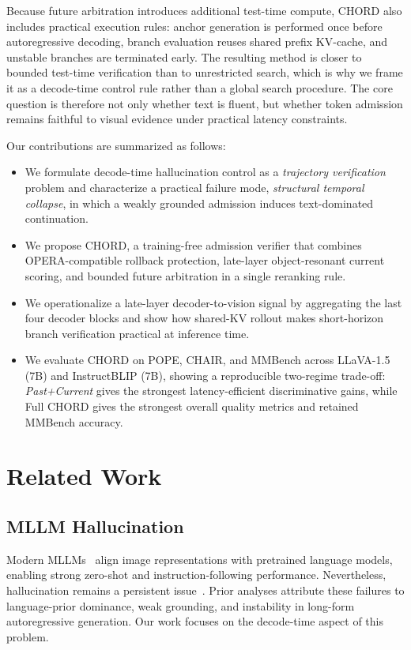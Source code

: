 \documentclass[sigconf,anonymous]{acmart}
\begin{document}
Because future arbitration introduces additional test-time compute, CHORD also includes practical execution rules: anchor generation is performed once before autoregressive decoding, branch evaluation reuses shared prefix KV-cache, and unstable branches are terminated early. The resulting method is closer to bounded test-time verification than to unrestricted search, which is why we frame it as a decode-time control rule rather than a global search procedure. The core question is therefore not only whether text is fluent, but whether token admission remains faithful to visual evidence under practical latency constraints.

Our contributions are summarized as follows:
\begin{itemize}
    \item We formulate decode-time hallucination control as a \emph{trajectory verification} problem and characterize a practical failure mode, \emph{structural temporal collapse}, in which a weakly grounded admission induces text-dominated continuation.
    \item We propose CHORD, a training-free admission verifier that combines OPERA-compatible rollback protection, late-layer object-resonant current scoring, and bounded future arbitration in a single reranking rule.
    \item We operationalize a late-layer decoder-to-vision signal by aggregating the last four decoder blocks and show how shared-KV rollout makes short-horizon branch verification practical at inference time.
    \item We evaluate CHORD on POPE, CHAIR, and MMBench across LLaVA-1.5 (7B) and InstructBLIP (7B), showing a reproducible two-regime trade-off: \textit{Past+Current} gives the strongest latency-efficient discriminative gains, while Full CHORD gives the strongest overall quality metrics and retained MMBench accuracy.
\end{itemize}

\section{Related Work}
\label{sec:related_work}

\subsection{MLLM Hallucination}

Modern MLLMs~\cite{alayrac2022flamingo,li2023blip2,liu2023improvedllava,instructblip,bai2023qwen,wang2023cogvlm,zhu2023minigpt,chen2024internvl,ye2024mplugowl2} align image representations with pretrained language models, enabling strong zero-shot and instruction-following performance. Nevertheless, hallucination remains a persistent issue~\cite{bai2025mllm_hallucination_survey,zhou2023analyzing,li2023pope,rohrbach2018object,lovenia2023nope,wang2023amber,guan2024hallusionbench,wu2024relationship_hallucinations,lu2023agnosia}. Prior analyses attribute these failures to language-prior dominance, weak grounding, and instability in long-form autoregressive generation. Our work focuses on the decode-time aspect of this problem.
\end{document}

